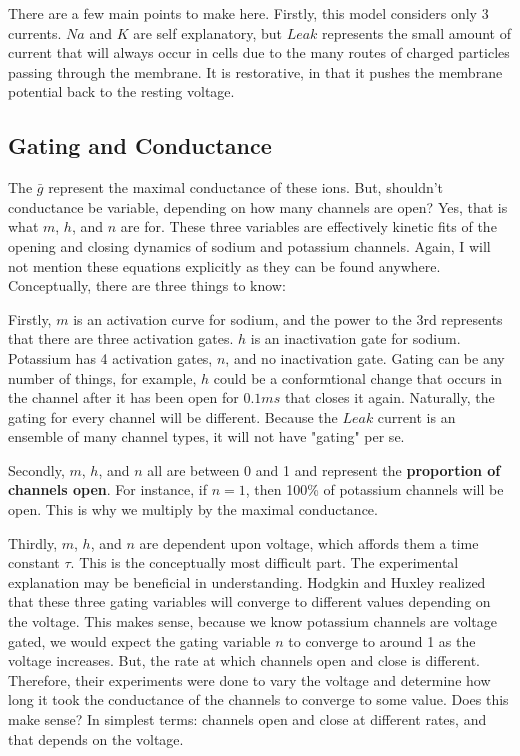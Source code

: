 \documentclass[12pt]{report}
\begin{document}
\bigskip 

There are a few main points to make here. Firstly, this model considers only 3 currents. $Na$ and $K$ are self explanatory, but $Leak$ represents the small amount of current that will always occur in cells due to the many routes of charged particles passing through the membrane. It is restorative, in that it pushes the membrane potential back to the resting voltage.\newline

\subsection{Gating and Conductance} The $\bar{g}$ represent the maximal conductance of these ions. But, shouldn't conductance be variable, depending on how many channels are open? Yes, that is what $m$, $h$, and $n$ are for. These three variables are effectively kinetic fits of the opening and closing dynamics of sodium and potassium channels. Again, I will not mention these equations explicitly as they can be found anywhere. Conceptually, there are three things to know:\newline

Firstly, $m$ is an activation curve for sodium, and the power to the 3rd represents that there are three activation gates. $h$ is an inactivation gate for sodium. Potassium has 4 activation gates, $n$, and no inactivation gate. Gating can be any number of things, for example, $h$ could be a conformtional change that occurs in the channel after it has been open for $0.1 ms$ that closes it again. Naturally, the gating for every channel will be different. Because the $Leak$ current is an ensemble of many channel types, it will not have "gating" per se.\newline

Secondly, $m$, $h$, and $n$ all are between 0 and 1 and represent the \textbf{proportion of channels open}. For instance, if $n = 1$, then 100\% of potassium channels will be open. This is why we multiply by the maximal conductance.\newline

Thirdly, $m$, $h$, and $n$ are dependent upon voltage, which affords them a time constant $\tau$. This is the conceptually most difficult part. The experimental explanation may be beneficial in understanding. Hodgkin and Huxley realized that these three gating variables will converge to different values depending on the voltage. This makes sense, because we know potassium channels are voltage gated, we would expect the gating variable $n$ to converge to around 1 as the voltage increases. But, the rate at which channels open and close is different. Therefore, their experiments were done to vary the voltage and determine how long it took the conductance of the channels to converge to some value. Does this make sense? In simplest terms: channels open and close at different rates, and that depends on the voltage.\newline
\end{document}
